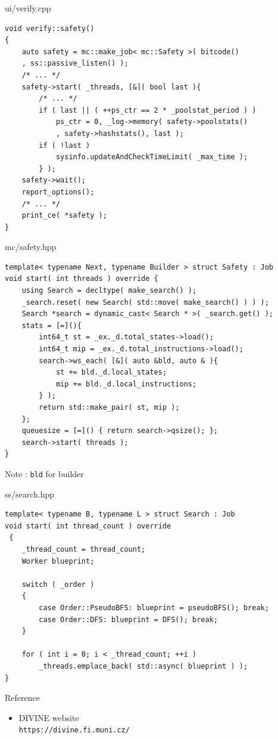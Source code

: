 \documentclass[12pt]{beamer}
\newcommand{\code}[1]{\texttt{#1}}
\begin{document}
\begin{frame}[fragile]{ui/verify.cpp}
\begin{lstlisting}[basicstyle=\footnotesize\ttfamily]
void verify::safety()
{
    auto safety = mc::make_job< mc::Safety >( bitcode()
    , ss::passive_listen() );
    /* ... */
    safety->start( _threads, [&]( bool last ){
        /* ... */
        if ( last || ( ++ps_ctr == 2 * _poolstat_period ) )
            ps_ctr = 0, _log->memory( safety->poolstats()
            , safety->hashstats(), last );
        if ( !last )
            sysinfo.updateAndCheckTimeLimit( _max_time );
        } );
    safety->wait();
    report_options();
    /* ... */
    print_ce( *safety );
}
\end{lstlisting}
\end{frame}

\begin{frame}[fragile]{mc/safety.hpp}
\begin{lstlisting}[basicstyle=\footnotesize\ttfamily]
template< typename Next, typename Builder > struct Safety : Job
void start( int threads ) override {
    using Search = decltype( make_search() );
    _search.reset( new Search( std::move( make_search() ) ) );
    Search *search = dynamic_cast< Search * >( _search.get() );
    stats = [=](){
        int64_t st = _ex._d.total_states->load();
        int64_t mip = _ex._d.total_instructions->load();
        search->ws_each( [&]( auto &bld, auto & ){
            st += bld._d.local_states;
            mip += bld._d.local_instructions;
        } );
        return std::make_pair( st, mip );
    };
    queuesize = [=]() { return search->qsize(); };
    search->start( threads );
}
\end{lstlisting}
Note : \code{bld} for builder
\end{frame}

\begin{frame}[fragile]{ss/search.hpp}
\begin{lstlisting}[basicstyle=\footnotesize\ttfamily]
template< typename B, typename L > struct Search : Job
void start( int thread_count ) override
 {
    _thread_count = thread_count;
    Worker blueprint;

    switch ( _order )
    {
        case Order::PseudoBFS: blueprint = pseudoBFS(); break;
        case Order::DFS: blueprint = DFS(); break;
    }

    for ( int i = 0; i < _thread_count; ++i )
        _threads.emplace_back( std::async( blueprint ) );
}
\end{lstlisting}
\end{frame}

\begin{frame}{Reference}
\begin{itemize}
    \item DIVINE website\\
        \code{https://divine.fi.muni.cz/}
\end{itemize}
\end{frame}
\end{document}
